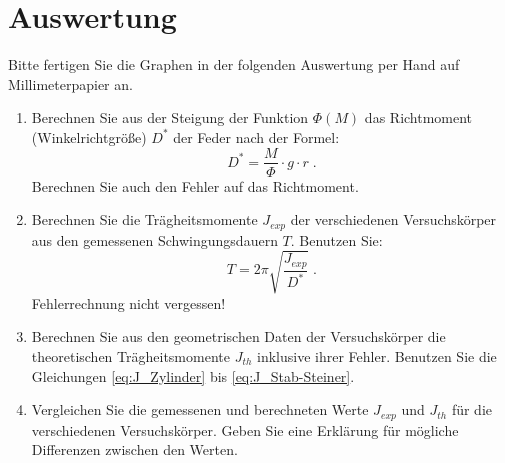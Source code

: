 \section{Auswertung} 

\begin{hint}
	Bitte fertigen Sie die Graphen in der folgenden Auswertung per Hand auf Millimeterpapier an.
\end{hint}

\begin{enumerate}
 \item Berechnen Sie aus der Steigung der Funktion $\Phi (M)$ das Richtmoment (Winkelrichtgröße) $D^*$ der Feder nach der Formel:
 \begin{equation}
 D^* = \frac{M}{\Phi}\cdot g\cdot r \; .
 \end{equation}
 Berechnen Sie auch den Fehler auf das Richtmoment.
 \item Berechnen Sie die Trägheitsmomente $J_{exp}$ der verschiedenen Versuchskörper aus den gemessenen Schwingungsdauern $T$. Benutzen Sie:
 \begin{equation}
 T = 2\pi\sqrt{\frac{J_{exp}}{D^*}} \; .
 \end{equation}
 Fehlerrechnung nicht vergessen!
 \item Berechnen Sie aus den geometrischen Daten der Versuchskörper die theoretischen Trägheitsmomente $J_{th}$ inklusive ihrer Fehler. Benutzen Sie die Gleichungen \ref{eq:J_Zylinder} bis \ref{eq:J_Stab-Steiner}.
 \item Vergleichen Sie die gemessenen und berechneten Werte $J_{exp}$ und $J_{th}$ für die verschiedenen Versuchskörper. Geben Sie eine Erklärung für mögliche Differenzen zwischen den Werten.
\end{enumerate}